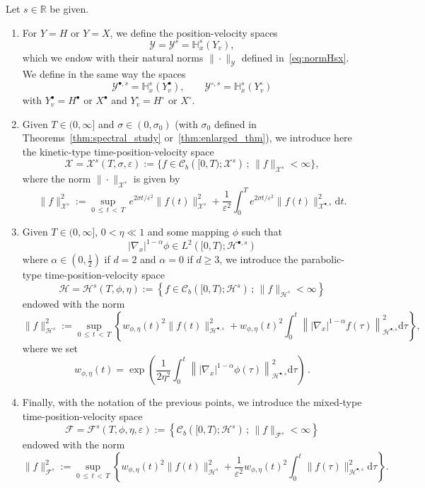 \documentclass[AHL,Unicode,longabstracts,published]{cedram}
\renewcommand{\d}{\mathrm{d}}
\newcommand{\R}{\mathbb{R}}
\newcommand{\bbH}{\mathbb{H}}
\newcommand{\CC}{\mathcal{C}}
\newcommand{\XX}{\mathcal{X}}
\newcommand{\HH}{\mathcal{H}}
\newcommand{\VV}{\mathcal{Y}}
\newcommand{\FFF}{\mathscr{F}}
\newcommand{\HHH}{\mathscr{H}}
\newcommand{\GGG}{\mathscr{X}}
\newcommand{\Ss}{H}
\newcommand{\Ssp}{H^{\bullet}}
\newcommand{\Ssm}{H^{\circ}}
\newcommand{\rSSs}[1]{\HH^{#1}}
\newcommand{\rSSsp}[1]{\HH^{{\bullet}, #1}}
\newcommand{\SSSs}{\HHH}
\newcommand{\rSSSs}[1]{\HHH^{#1}}
\newcommand{\Sl}{X}
\newcommand{\Slp}{X^{\bullet}}
\newcommand{\Slm}{X^{\circ}}
\newcommand{\rSSl}[1]{\XX^{#1}}
\newcommand{\rSSlp}[1]{\XX^{\bullet, #1}}
\newcommand{\SSSl}{\GGG}
\newcommand{\rSSSl}[1]{\GGG^{#1}}
\newcommand{\SSSm}{\FFF}
\newcommand{\rSSSm}[1]{\FFF^{#1}}
\newcommand{\Sg}{Y}
\newcommand{\Sgp}{Y^{\bullet}}
\newcommand{\Sgm}{Y^{\circ}}
\newcommand{\SSg}{\VV}
\newcommand{\rSSgp}[1]{\VV^{\bullet, #1}}
\newcommand{\rSSgm}[1]{\VV^{\circ, #1}}
\renewcommand*\le{\leqslant}
\renewcommand*\ge{\geqslant}
\newcommand*\eps{{\varepsilon}}
\begin{document}
\begin{defi}\label{defi:NORMSPACES}
Let $s \in \R$ be given.
\begin{enumerate}
\item For $\Sg=\Ss$ or $\Sg=\Sl$, we define the position-velocity spaces
\[
\SSg = \SSg^s = \bbH^{s}_{x}(\Sg_v),
\]
which we endow with their natural norms $\|\cdot\|_{\SSg}$ defined in~\eqref{eq:normHsx}. We define in the same way the spaces
\[
\rSSgp{s}=\bbH^s_x(\Sgp_v), \qquad \rSSgm{s}=\bbH^s_x(\Sgm_v)
\]
with $\Sgp_v=\Ssp$ or $\Slp$ and $\Sgm_v=\Ssm$ or $\Slm.$
\item Given $T \in (0,\infty]$ and $\sigma \in (0,\sigma_0)$ (with $\sigma_0$ defined in Theorems~\ref{thm:spectral_study} or~\ref{thm:enlarged_thm}), we introduce here the kinetic-type time-position-velocity space
\[
\SSSl=\rSSSl{s}(T, \sigma, \eps):= \big\{ f \in \CC_b\left([0, T) ; \rSSl{s} \right) \, ; \, \| f \|_{\rSSSl{s}} < \infty \big\},
\]
where the norm $\| \cdot \|_{\rSSSl{s}}$ is given by
\[
\| f \|_{ \rSSSl{s}}^2 := \sup_{0\,\le\,t\,<\,T} \, e^{2 \sigma t / \eps^2 } \| f(t) \|_{\rSSl{s}}^2 + \frac{1}{\eps^2} \int_0^T e^{2 \sigma t / \eps^2} \| f(t) \|_{{\rSSlp{s}}}^2 \d t.
\]
\item Given $T \in (0,\infty]$, $0 < \eta \ll 1$ and some mapping $\phi$ such that
\begin{equation}\label{eq:nablaPhi}
\left|\nabla_x\right|^{1-\alpha}\phi \in L^2\left([0, T) ; \rSSsp{s} \right)
\end{equation}
where $\alpha \in (0, \frac{1}{2})$ if $d = 2$ and $\alpha = 0$ if $d \ge 3$, we introduce the parabolic-type time-position-velocity space
\[
\SSSs=\rSSSs{s}(T, \phi, \eta):= \left\{ f \in \CC_b\left([0, T) ; \rSSs{s} \right) \, ; \, \| f \|_{\rSSSs{s}} < \infty \right\}
\]
endowed with the norm
\[
\| f \|_{\rSSSs{s}}^2 := \sup_{0\,\le\,t\,<\,T} \left\{ w_{\phi, \eta}(t)^2 \| f(t) \|_{\rSSsp{s}}^2 + w_{\phi, \eta}(t)^2 \int_0^t \left\| |\nabla_x|^{1-\alpha} f(\tau) \right\|_{\rSSsp{s}}^2 \d \tau \right\},
\]
where we set
\begin{equation}\label{eq:wphieta}
w_{\phi, \eta}(t) = \exp\left(\frac{1}{2 \eta^2} \int_0^t\left\| |\nabla_x|^{1-\alpha} \phi(\tau) \right\|_{\rSSsp{s}}^2 \d \tau \right)\,.
\end{equation}
\item Finally, with the notation of the previous points, we introduce the mixed-type time-position-velocity space
\[
\SSSm = \rSSSm{s}(T, \phi, \eta, \eps):= \left\{ \CC_b\left([0, T) ; \rSSs{s} \right) \, ; \, \| f \|_{\rSSSm{s}} < \infty \right\}
\]
endowed with the norm
\[
\| f \|_{\rSSSm{s}}^2 := \sup_{0\,\le\,t\,<\,T} \left\{ w_{\phi, \eta}(t)^2 \| f(t) \|_{\rSSs{s}}^2 + \frac{1}{\eps^2} w_{\phi, \eta}(t)^2 \int_0^t \| f(\tau) \|_{\rSSsp{s}}^2 \d \tau \right\}.
\]
\end{enumerate}
\end{defi}
\end{document}
